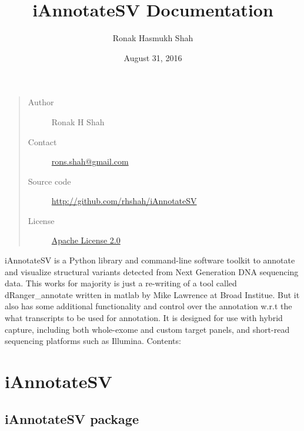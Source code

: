 \documentclass[letterpaper,10pt,english]{sphinxmanual}
\title{iAnnotateSV Documentation}
\date{August 31, 2016}
\author{Ronak Hasmukh Shah}
\begin{document}
\maketitle
\tableofcontents
{}\label{index::doc}

\begin{quote}\begin{description}
\item[{Author}] \leavevmode
Ronak H Shah

\item[{Contact}] \leavevmode
\href{mailto:rons.shah@gmail.com}{rons.shah@gmail.com}

\item[{Source code}] \leavevmode
\href{http://github.com/rhshah/iAnnotateSV}{http://github.com/rhshah/iAnnotateSV}

\item[{License}] \leavevmode
\href{http://www.apache.org/licenses/LICENSE-2.0}{Apache License 2.0}

\end{description}\end{quote}

iAnnotateSV is a Python library and command-line software toolkit to annotate and
visualize structural variants detected from Next Generation DNA sequencing data. This works for majority is just a re-writing of a tool called dRanger\_annotate written in matlab by Mike Lawrence at Broad Institue.
But it also has some additional functionality and control over the annotation w.r.t the what transcripts to be used for annotation.
It is designed for use with hybrid capture, including both whole-exome and custom target panels, and
short-read sequencing platforms such as Illumina.
\href{https://landscape.io/github/rhshah/iAnnotateSV/master}{}\href{https://zenodo.org/badge/latestdoi/18929/rhshah/iAnnotateSV}{}
Contents:


\chapter{iAnnotateSV}
\label{modules::doc}\label{modules:iannotatesv-annotation-of-structural-variants-detected-from-ngs}\label{modules:iannotatesv}

\section{iAnnotateSV package}
\label{iAnnotateSV:iannotatesv-package}\label{iAnnotateSV::doc}
\end{document}
